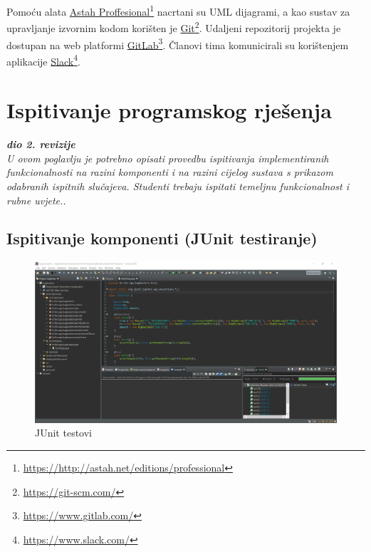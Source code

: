		 Pomoću alata \underline{Astah Proffesional}\footnote{\url{https://http://astah.net/editions/professional}} nacrtani su UML dijagrami, a kao sustav za upravljanje izvornim kodom korišten je \underline{Git}\footnote{\url{https://git-scm.com/}}. Udaljeni repozitorij projekta je dostupan na web platformi
		\underline{GitLab}\footnote{\url{https://www.gitlab.com/}}. Članovi tima komunicirali su korištenjem aplikacije \underline{Slack}\footnote{\url{https://www.slack.com/}}.
		
		
	\newpage
		\section{Ispitivanje programskog rješenja}
			
			\textbf{\textit{dio 2. revizije}}\\
			
			 \textit{U ovom poglavlju je potrebno opisati provedbu ispitivanja implementiranih funkcionalnosti na razini komponenti i na razini cijelog sustava s prikazom odabranih ispitnih slučajeva. Studenti trebaju ispitati temeljnu funkcionalnost i rubne uvjete..}
	
			
			\subsection{Ispitivanje komponenti (JUnit testiranje)}
			\begin{figure}[H]
				\includegraphics[scale=0.4]{Slike/junit.png}
				\centering
				\caption{JUnit testovi}
				\label{fig:dijagram}
			\end{figure}
		
